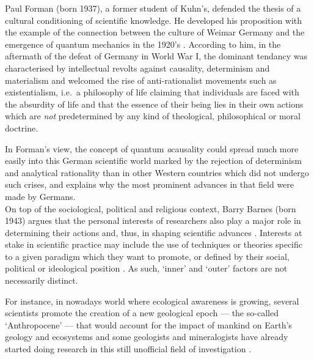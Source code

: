 Paul Forman (born 1937), a former student of Kuhn's, defended the thesis of a cultural conditioning of scientific knowledge.
He developed his proposition with the example of the connection between the culture of Weimar Germany and the emergence of quantum mechanics in the 1920's \citep{forman1971weimar}.
According to him, in the aftermath of the defeat of Germany in World War I, the dominant tendancy was characterised by intellectual revolts against causality, determinism and materialism and welcomed the rise of anti-rationalist movements such as existentialism, i.e.\ a philosophy of life claiming that individuals are faced with the absurdity of life and that the essence of their being lies in their own actions which are \textit{not} predetermined by any kind of theological, philosophical or moral doctrine.

In Forman's view, the concept of quantum \textit{a}causality could spread much more easily into this German scientific world marked by the rejection of determinism and analytical rationality than in other Western countries which did not undergo such crises, and explains why the most prominent advances in that field were made by Germans.\\

On top of the sociological, political and religious context, Barry Barnes (born 1943) argues that the personal interests of researchers also play a major role in determining their actions and, thus, in shaping scientific advances \citep{barnes1977interests}.
Interests at stake in scientific practice may include the use of techniques or theories specific to a given paradigm which they want to promote, or defined by their social, political or ideological position \citep{gingras2017determinants}.
As such, ‘inner’ and ‘outer’ factors are not necessarily distinct.

For instance, in nowadays world where ecological awareness is growing, several scientists promote the creation of a new geological epoch — the so-called ‘Anthropocene’ — that would account for the impact of mankind on Earth's geology and ecosystems \citep{crutzen2002geology} and some geologists and mineralogists have already started doing research in this still unofficial field of investigation \citep{corcoran2014anthropogenic,hazen2017mineralogy}.\\




